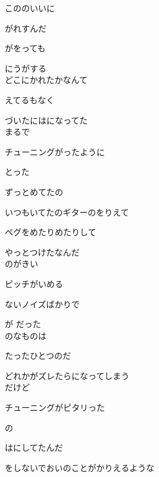 こののいいに

がれすんだ

がをっても

にうがする
\\

どこにかれたかなんて

えてるもなく

づいたにはになってた
\\

まるで

チューニングがったように

とった

ずっとめてたの

いつもいてたのギターのをりえて

ペグをめたりめたりして

やっとつけたなんだ
\\

のがきい

ピッチがいめる

ないノイズばかりで

が だった
\\

のなものは

たったひとつのだ

どれかがズレたらになってしまう
\\

だけど

チューニングがピタリった

の

はにしてたんだ

をしないでおいのことがかりえるような

